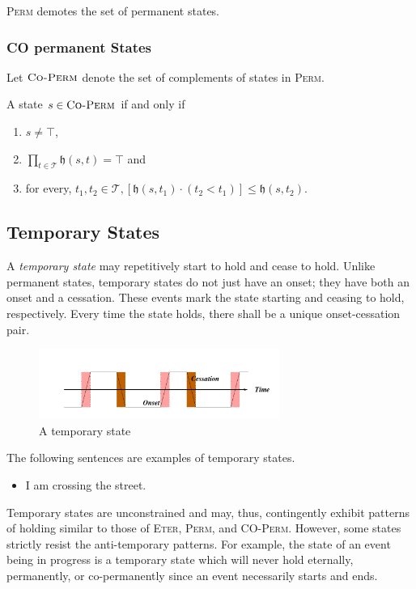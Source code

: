 \textsc{Perm} demotes the set of permanent states.

\subsubsection{CO permanent States}
Let $\textsc{Co-Perm}$ denote the set of complements of states in \textsc{Perm}.

A state $s \in \textsc{Co-Perm}$ if and only if
\begin{enumerate}
	\item $s \neq \top$,
	\item $\displaystyle \prod_{t \in \mathcal{T}} \mathfrak{h}(s, t) = \top$ and
	\item for every, $t_1, t_2 \in \mathcal{T}, [\mathfrak{h}(s, t_1) \cdot (t_2 < t_1)] \leq \mathfrak{h}(s, t_2)$.
\end{enumerate}


\subsection{Temporary States}
A \textit{temporary state} may repetitively start to hold and cease to hold. Unlike
permanent states, temporary states do not just have an onset; they have both an onset and a cessation.
These events mark the state starting and ceasing to hold, respectively. Every time
the state holds, there shall be a unique onset-cessation pair.

\begin{figure}[H]
	\centering
	\includegraphics[width=0.7\textwidth]{images/temp-states.png}
	\caption{A temporary state}
	\label{fig:temporary}
\end{figure}

The following sentences are examples of temporary states.

\begin{itemize}
	\item I am crossing the street.
\end{itemize}

Temporary states are unconstrained and may, thus,
contingently exhibit patterns of holding similar to those of \textsc{Eter}, \textsc{Perm}, and \textsc{CO-Perm}. However, some states strictly
resist the anti-temporary patterns. For example, the state of
an event being in progress is a temporary state which will
never hold eternally, permanently, or co-permanently since
an event necessarily starts and ends.

